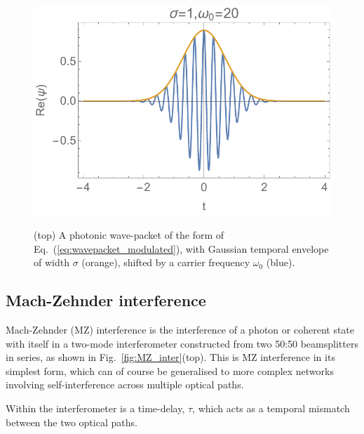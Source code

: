 \documentclass[aps, rmp, twocolumn, amsmath, amssymb, nofootinbib, superscriptaddress, longbibliography, floatfix, table-of-contents, eqsecnum]{revtex4-1}
\begin{document}
\begin{figure}[!htb]
	\includegraphics[width=\columnwidth]{wavepacket} \\
	\caption{(top) A photonic wave-packet of the form of Eq.~(\ref{eq:wavepacket_modulated}), with Gaussian temporal envelope of width $\sigma$ (orange), shifted by a carrier frequency $\omega_0$ (blue).} \label{fig:HOM_vs_MZ}
\end{figure}

%
%

\subsection{Mach-Zehnder interference}  \label{sec:MZ_inter}

Mach-Zehnder (MZ) interference is the interference of a photon or coherent state with itself in a two-mode interferometer constructed from two 50:50 beamsplitters in series, as shown in Fig.~\ref{fig:MZ_inter}(top). This is MZ interference in its simplest form, which can of course be generalised to more complex networks involving self-interference across multiple optical paths.

Within the interferometer is a time-delay, $\tau$, which acts as a temporal mismatch between the two optical paths. 
\end{document}
